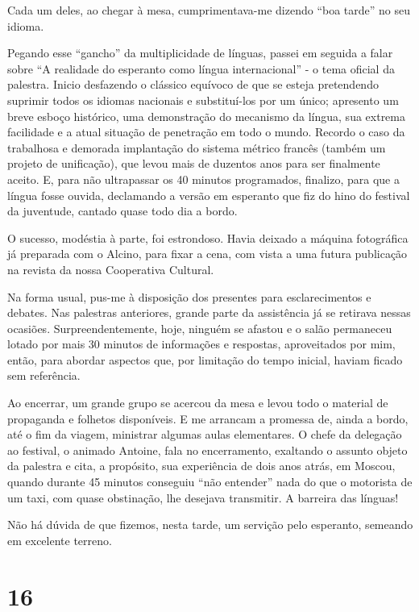 Cada um deles, ao chegar à mesa, cumprimentava-me dizendo “boa tarde” no seu idioma.

Pegando esse “gancho” da multiplicidade de línguas, passei em seguida a falar sobre “A realidade do esperanto como língua internacional” - o tema oficial da palestra. Inicio desfazendo o clássico equívoco de que se esteja pretendendo suprimir todos os idiomas nacionais e substituí-los por um único; apresento um breve esboço histórico, uma demonstração do mecanismo da língua, sua extrema facilidade e a atual situação de penetração em todo o mundo. Recordo o caso da trabalhosa e demorada implantação do sistema métrico francês (também um projeto de unificação), que levou mais de duzentos anos para ser finalmente aceito. E, para não ultrapassar os 40 minutos programados, finalizo, para que a língua fosse ouvida, declamando a versão em esperanto que fiz do hino do festival da juventude, cantado quase todo dia a bordo.

O sucesso, modéstia à parte, foi estrondoso. Havia deixado a máquina fotográfica já preparada com o Alcino, para fixar a cena, com vista a uma futura publicação na revista da nossa Cooperativa Cultural.

Na forma usual, pus-me à disposição dos presentes para esclarecimentos e debates. Nas palestras anteriores, grande parte da assistência já se retirava nessas ocasiões. Surpreendentemente, hoje, ninguém se afastou e o salão permaneceu lotado por mais 30 minutos de informações e respostas, aproveitados por mim, então, para abordar aspectos que, por limitação do tempo inicial, haviam ficado sem referência.

Ao encerrar, um grande grupo se acercou da mesa e levou todo o material de propaganda e folhetos disponíveis. E me arrancam a promessa de, ainda a bordo, até o fim da viagem, ministrar algumas aulas elementares. O chefe da delegação ao festival, o animado Antoine, fala no encerramento, exaltando o assunto objeto da palestra e cita, a propósito, sua experiência de dois anos atrás, em Moscou, quando durante 45 minutos conseguiu “não entender” nada do que o motorista de um taxi, com quase obstinação, lhe desejava transmitir. A barreira das línguas!

Não há dúvida de que fizemos, nesta tarde, um servição pelo esperanto, semeando em excelente terreno.

\section*{16 \adfflatleafright {}}

